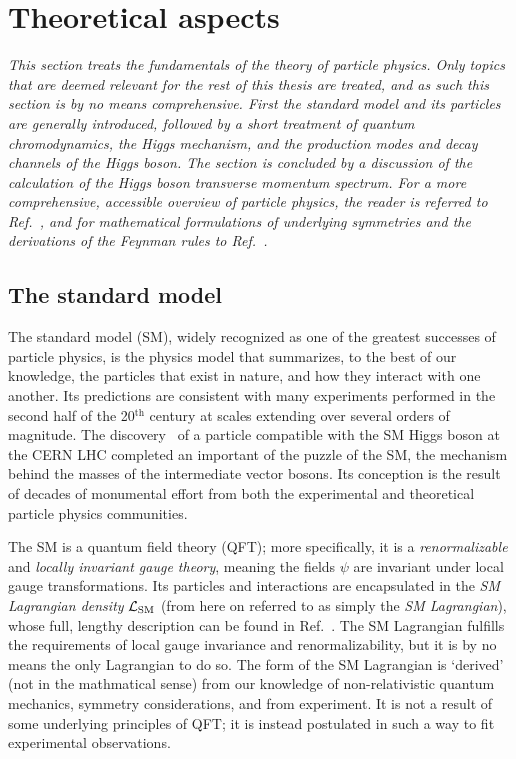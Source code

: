 \section{Theoretical aspects}

\emph{%
% 
This section treats the fundamentals of the theory of particle physics.
% 
Only topics that are deemed relevant for the rest of this thesis are treated, and as such this section is by no means comprehensive.
%
First the standard model and its particles are generally introduced, followed by a short treatment of quantum chromodynamics, the Higgs mechanism, and the production modes and decay channels of the Higgs boson.
% 
The section is concluded by a discussion of the calculation of the Higgs boson transverse momentum spectrum.
% 
For a more comprehensive, accessible overview of particle physics, the reader is referred to Ref.~\cite{griffiths}, and for mathematical formulations of underlying symmetries and the derivations of the Feynman rules to Ref.~\cite{peskin}.
}

\subsection{The standard model}

The standard model (SM), widely recognized as one of the greatest successes of particle physics, is the physics model that summarizes, to the best of our knowledge, the particles that exist in nature, and how they interact with one another.
% 
Its predictions are consistent with many experiments performed in the second half of the 20${}^\text{th}$ century at scales extending over several orders of magnitude.
% 
The discovery~\cite{Aad:2012tfa,Chatrchyan:2012xdj,Chatrchyan:2013lba} of a particle compatible with the SM Higgs boson at the CERN LHC completed an important of the puzzle of the SM, the mechanism behind the masses of the intermediate vector bosons.
% 
Its conception is the result of decades of monumental effort from both the experimental and theoretical particle physics communities.


The SM is a quantum field theory (QFT); more specifically, it is a \textit{renormalizable} and \textit{locally invariant gauge theory}, meaning the fields $\psi$ are invariant under local gauge transformations.
% 
Its particles and interactions are encapsulated in the \textit{SM Lagrangian density} $\mathcal{L}_\text{SM}$ (from here on referred to as simply the \textit{SM Lagrangian}), whose full, lengthy description can be found in Ref.~\cite{todo}.
% 
The SM Lagrangian fulfills the requirements of local gauge invariance and renormalizability, but it is by no means the only Lagrangian to do so.
% 
The form of the SM Lagrangian is `derived' (not in the mathmatical sense) from our knowledge of non-relativistic quantum mechanics, symmetry considerations, and from experiment.
% 
It is not a result of some underlying principles of QFT; it is instead postulated in such a way to fit experimental observations.


